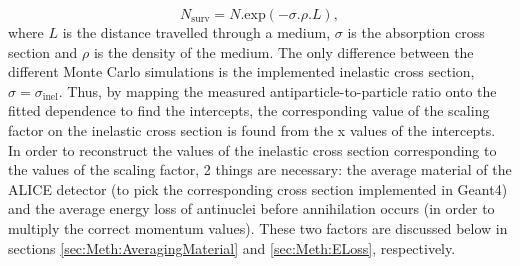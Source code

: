 \begin{equation}\label{eq:LambertBeer}
    N_{\mathrm{surv}} = N . \mathrm{exp}\left( -\sigma . \rho . L \right),
\end{equation}
where $L$ is the distance travelled through a medium, $\sigma$ is the absorption cross section and $\rho$ is the density of the medium. The only difference between the different Monte Carlo simulations is the implemented inelastic cross section, $\sigma = \sigma_\mathrm{inel}$. Thus, by mapping the measured antiparticle-to-particle ratio onto the fitted dependence to find the intercepts, the corresponding value of the scaling factor on the inelastic cross section is found from the x values of the intercepts. In order to reconstruct the values of the inelastic cross section corresponding to the values of the scaling factor, 2 things are necessary: the average material of the ALICE detector (to pick the corresponding cross section implemented in Geant4) and the average energy loss of antinuclei before annihilation occurs (in order to multiply the correct momentum values). These two factors are discussed below in sections \ref{sec:Meth:AveragingMaterial} and \ref{sec:Meth:ELoss}, respectively.\\
\\

